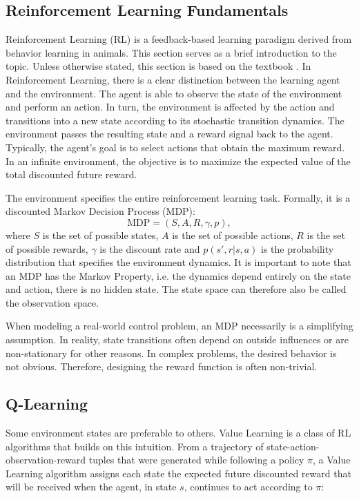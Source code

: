 \subsection{Reinforcement Learning Fundamentals}
Reinforcement Learning (RL) is a feedback-based learning paradigm derived from behavior learning in animals.
This section serves as a brief introduction to the topic.
Unless otherwise stated, this section is based on the textbook \cite{sutton2018ReinforcementLearningIntroduction}.
In Reinforcement Learning, there is a clear distinction between the learning agent and the environment.
The agent is able to observe the state of the environment and perform an action.
In turn, the environment is affected by the action and transitions into a new state according to its stochastic transition dynamics.
The environment passes the resulting state and a reward signal back to the agent.
Typically, the agent's goal is to select actions that obtain the maximum reward.
In an infinite environment, the objective is to maximize the expected value of the total discounted future reward.

The environment specifies the entire reinforcement learning task.
Formally, it is a discounted Markov Decision Process (MDP):
$$ \text{MDP} = (S, A, R, \gamma, p),$$
where $S$ is the set of possible states, $A$ is the set of possible actions, $R$ is the set of possible rewards, $\gamma$ is the discount rate and $p(s', r|s,a)$ is the probability distribution that specifies the environment dynamics.
It is important to note that an MDP has the Markov Property, i.e. the dynamics depend entirely on the state and action, there is no hidden state.
The state space can therefore also be called the observation space.

When modeling a real-world control problem, an MDP necessarily is a simplifying assumption.
In reality, state transitions often depend on outside influences or are non-stationary for other reasons.
In complex problems, the desired behavior is not obvious. Therefore, designing the reward function is often non-trivial.


\subsection{Q-Learning}
Some environment states are preferable to others.
Value Learning is a class of RL algorithms that builds on this intuition.
From a trajectory of state-action-observation-reward tuples that were generated while following a policy $\pi$, a Value Learning algorithm assigns each state the expected future discounted reward that will be received when the agent, in state $s$, continues to act according to $\pi$:

